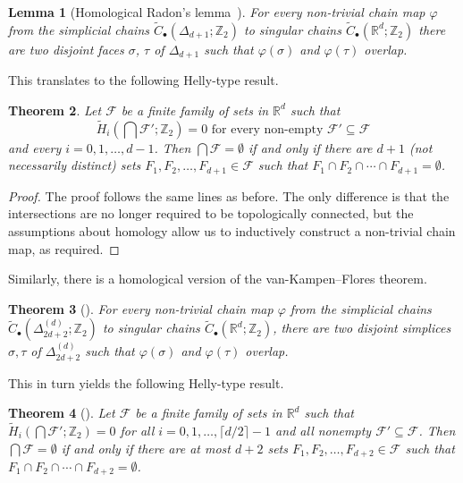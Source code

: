 \documentclass[a4paper,12pt]{amsart}
\newcommand{\R}{\mathbb{R}} 	%
\newcommand{\Z}{\mathbb{Z}} 	%
\newtheorem{theorem}{Theorem}
\newtheorem{lemma}[theorem]{Lemma}
\theoremstyle{definition}
\begin{document}
\begin{lemma}[Homological Radon's lemma~\cite{hb17}]\label{lem:homRad}
 For every non-trivial chain map $\varphi$ from the simplicial chains $\widetilde{C}_\bullet(\Delta_{d+1};\Z_2)$ to singular chains $\widetilde{C}_\bullet(\R^d;\Z_2)$ there are two disjoint faces $\sigma$, $\tau$ of $\Delta_{d+1}$ such that $\varphi(\sigma)$ and $\varphi(\tau)$ overlap.
\end{lemma}
This translates to the following Helly-type result.
\begin{theorem}{\cite{hb17}}\label{thm:topHelSharp}
 Let $\mathcal F$ be a finite family of sets in $\R^d$ such that \[\widetilde{H}_i\left(\bigcap \mathcal F';\Z_2\right)=0\text{ for every non-empty }\mathcal F'\subseteq\mathcal F\] and every $i=0,1,\ldots, d-1$. Then $\bigcap \mathcal F=\emptyset$ if and only if there are $d+1$ (not necessarily distinct) sets $F_1,F_2,\ldots, F_{d+1}\in\mathcal F$ such that $F_1\cap F_2\cap\cdots\cap F_{d+1}=\emptyset$.
\end{theorem}
\begin{proof}
 The proof follows the same lines as before. The only difference is that the intersections are no longer required to be topologically connected, but the assumptions about homology allow us to inductively construct a non-trivial chain map, as required.
\end{proof}

Similarly, there is a homological version of the van-Kampen--Flores theorem. 
\begin{theorem}[\cite{hb17}]\label{t:hom_vank_Kampes}
 For every non-trivial chain map $\varphi$ from the simplicial chains $\widetilde{C}_\bullet(\Delta_{2d+2}^{(d)};\Z_2)$ to singular chains $\widetilde C_\bullet(\R^d;\Z_2)$, there are two disjoint simplices $\sigma,\tau$ of $\Delta_{2d+2}^{(d)}$ such that $\varphi(\sigma)$ and $\varphi(\tau)$ overlap.
\end{theorem}
This in turn yields the following Helly-type result.
\begin{theorem}[\cite{hb17}]
 Let $\mathcal F$ be a finite family of sets in $\R^d$ such that $\widetilde{H}_i\left(\bigcap \mathcal F';\Z_2\right)=0$ for all $i=0,1,\ldots, \lceil d/2\rceil-1$ and all nonempty $\mathcal F'\subseteq \mathcal F$. Then $\bigcap \mathcal F=\emptyset$ if and only if there are at most $d+2$ sets $F_1,F_2,\ldots, F_{d+2}\in\mathcal F$ such that $F_1\cap F_2\cap\cdots\cap F_{d+2}=\emptyset$.
\end{theorem}
\end{document}
